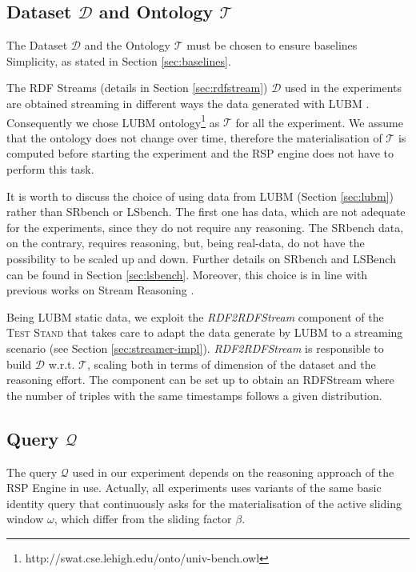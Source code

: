 \subsection{Dataset $\mathcal{D}$ and Ontology $\mathcal{T}$}\label{sec:dataset}

\noindent The Dataset  $\mathcal{D}$ and the Ontology $\mathcal{T}$ must be chosen to ensure baselines Simplicity, as stated in Section \ref{sec:baselines}. 

The RDF Streams (details in Section \ref{sec:rdfstream}) $\mathcal{D}$ used in the experiments are obtained streaming in different ways the data generated with LUBM  \cite{Guo2005}. Consequently we chose LUBM ontology\footnote{http://swat.cse.lehigh.edu/onto/univ-bench.owl} as $\mathcal{T}$ for all the experiment. We assume that the ontology does not change over time, therefore the materialisation of $\mathcal{T}$ is computed before starting the experiment and the RSP engine does not have to perform this task. 

It is worth to discuss the choice of using data from LUBM (Section \ref{sec:lubm}) rather than SRbench or LSbench. The first one has data, which are not adequate for the experiments, since they do not require any reasoning. The SRbench data, on the contrary, requires reasoning, but, being real-data, do not have the possibility to be scaled up and down. Further details on SRbench and LSBench can be found in Section \ref{sec:lsbench}. Moreover, this choice is in line with previous works on Stream Reasoning \cite{DBLP:conf/semweb/UrbaniMJHB13}. 

Being LUBM static data, we exploit the \textit{RDF2RDFStream} component of the \textsc{Test Stand} that takes care to adapt the data generate by LUBM to a streaming scenario (see Section \ref{sec:streamer-impl}). \textit{RDF2RDFStream} is responsible to build $\mathcal{D}$ w.r.t. $\mathcal{T}$, scaling both in terms of dimension of the dataset and the reasoning effort. The component can be set up to obtain an RDFStream where the number of triples with the same timestamps follows a given distribution. %

\subsection{Query $\mathcal{Q}$}\label{sec:query}
 
The query $\mathcal{Q}$ used in our experiment depends on the reasoning approach of the RSP Engine in use. Actually, all  experiments uses variants of the same basic identity query that continuously asks for the materialisation of the active sliding window $\omega$, which differ from the sliding factor $\beta$.\\


